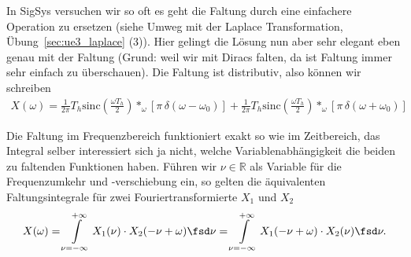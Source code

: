 \begin{ExCalc}
In SigSys versuchen wir so oft es geht die Faltung durch eine einfachere Operation
zu ersetzen (siehe Umweg mit der Laplace Transformation, Übung~\ref{sec:ue3_laplace} (3)).
Hier gelingt die Lösung nun aber sehr elegant eben genau mit der Faltung (Grund:
weil wir mit Diracs falten, da ist Faltung immer sehr einfach zu überschauen).
Die Faltung ist distributiv, also können wir schreiben
\begin{align}
X(\omega) = \frac{1}{2\pi}
T_h \mathrm{sinc}\left(\frac{\omega T_h}{2}\right) \ast_\omega
[\pi \, \delta(\omega-\omega_0)]
+
\frac{1}{2\pi}
T_h \mathrm{sinc}\left(\frac{\omega T_h}{2}\right) \ast_\omega
[\pi \, \delta(\omega+\omega_0)]
\end{align}

Die Faltung im Frequenzbereich funktioniert exakt so wie im Zeitbereich, das
Integral selber interessiert sich ja nicht, welche Variablenabhängigkeit die
beiden zu faltenden Funktionen haben.
Führen wir $\nu\in\mathbb{R}$ als Variable für die Frequenzumkehr und
-verschiebung ein, so
gelten die äquivalenten Faltungsintegrale für zwei Fouriertransformierte
$X_1$ und $X_2$
\begin{equation}
X(\omega)  =
\int\limits_{\nu=-\infty}^{+\infty} X_1(\nu) \cdot X_2(-\nu+\omega) \fsd \nu
=
\int\limits_{\nu=-\infty}^{+\infty} X_1(-\nu+\omega) \cdot X_2(\nu) \fsd \nu.
\end{equation}


\end{ExCalc}
